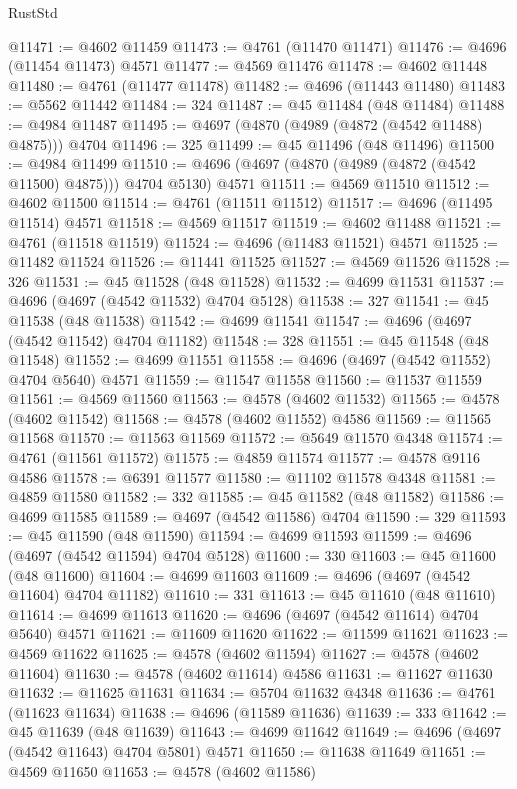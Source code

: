 \begin{lexlean}{RustStd}
\begin{coremodule}
@11471 := @4602 @11459
@11473 := @4761 (@11470 @11471)
@11476 := @4696 (@11454 @11473) @4571
@11477 := @4569 @11476
@11478 := @4602 @11448
@11480 := @4761 (@11477 @11478)
@11482 := @4696 (@11443 @11480)
@11483 := @5562 @11442
@11484 := 324
@11487 := @45 @11484 (@48 @11484)
@11488 := @4984 @11487
@11495 := @4697 (@4870 (@4989 (@4872 (@4542 @11488) @4875))) @4704
@11496 := 325
@11499 := @45 @11496 (@48 @11496)
@11500 := @4984 @11499
@11510 := @4696 (@4697 (@4870 (@4989 (@4872 (@4542 @11500) @4875))) @4704 @5130) @4571
@11511 := @4569 @11510
@11512 := @4602 @11500
@11514 := @4761 (@11511 @11512)
@11517 := @4696 (@11495 @11514) @4571
@11518 := @4569 @11517
@11519 := @4602 @11488
@11521 := @4761 (@11518 @11519)
@11524 := @4696 (@11483 @11521) @4571
@11525 := @11482 @11524
@11526 := @11441 @11525
@11527 := @4569 @11526
@11528 := 326
@11531 := @45 @11528 (@48 @11528)
@11532 := @4699 @11531
@11537 := @4696 (@4697 (@4542 @11532) @4704 @5128)
@11538 := 327
@11541 := @45 @11538 (@48 @11538)
@11542 := @4699 @11541
@11547 := @4696 (@4697 (@4542 @11542) @4704 @11182)
@11548 := 328
@11551 := @45 @11548 (@48 @11548)
@11552 := @4699 @11551
@11558 := @4696 (@4697 (@4542 @11552) @4704 @5640) @4571
@11559 := @11547 @11558
@11560 := @11537 @11559
@11561 := @4569 @11560
@11563 := @4578 (@4602 @11532)
@11565 := @4578 (@4602 @11542)
@11568 := @4578 (@4602 @11552) @4586
@11569 := @11565 @11568
@11570 := @11563 @11569
@11572 := @5649 @11570 @4348
@11574 := @4761 (@11561 @11572)
@11575 := @4859 @11574
@11577 := @4578 @9116 @4586
@11578 := @6391 @11577
@11580 := @11102 @11578 @4348
@11581 := @4859 @11580
@11582 := 332
@11585 := @45 @11582 (@48 @11582)
@11586 := @4699 @11585
@11589 := @4697 (@4542 @11586) @4704
@11590 := 329
@11593 := @45 @11590 (@48 @11590)
@11594 := @4699 @11593
@11599 := @4696 (@4697 (@4542 @11594) @4704 @5128)
@11600 := 330
@11603 := @45 @11600 (@48 @11600)
@11604 := @4699 @11603
@11609 := @4696 (@4697 (@4542 @11604) @4704 @11182)
@11610 := 331
@11613 := @45 @11610 (@48 @11610)
@11614 := @4699 @11613
@11620 := @4696 (@4697 (@4542 @11614) @4704 @5640) @4571
@11621 := @11609 @11620
@11622 := @11599 @11621
@11623 := @4569 @11622
@11625 := @4578 (@4602 @11594)
@11627 := @4578 (@4602 @11604)
@11630 := @4578 (@4602 @11614) @4586
@11631 := @11627 @11630
@11632 := @11625 @11631
@11634 := @5704 @11632 @4348
@11636 := @4761 (@11623 @11634)
@11638 := @4696 (@11589 @11636)
@11639 := 333
@11642 := @45 @11639 (@48 @11639)
@11643 := @4699 @11642
@11649 := @4696 (@4697 (@4542 @11643) @4704 @5801) @4571
@11650 := @11638 @11649
@11651 := @4569 @11650
@11653 := @4578 (@4602 @11586)

\end{coremodule}
\end{lexlean}
